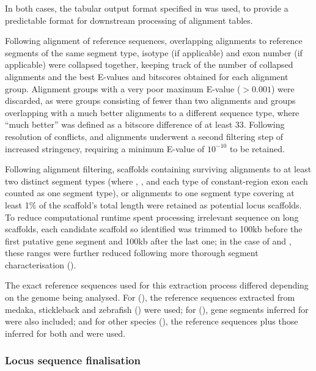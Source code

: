 \noindent In both cases, the tabular output format specified in  was used, to provide a predictable format for downstream processing of  alignment tables.

Following alignment of reference sequences, overlapping alignments to reference segments of the same segment type, isotype (if applicable) and exon number (if applicable) were collapsed together, keeping track of the number of collapsed alignments and the best E-values and bitscores obtained for each alignment group. Alignment groups with a very poor maximum E-value ($> 0.001$) were discarded, as were groups consisting of fewer than two alignments and groups overlapping with a much better alignments to a different sequence type, where ``much better'' was defined as a bitscore difference of at least 33. Following resolution of conflicts, \vh and \ch alignments underwent a second filtering step of increased stringency, requiring a minimum E-value of $10^{-10}$ to be retained. 

Following alignment filtering, scaffolds containing surviving alignments to at least two distinct segment types (where \vh, \jh, and each type of constant-region exon each counted as one segment type), or alignments to one segment type covering at least 1\% of the scaffold's total length were retained as potential locus scaffolds. To reduce computational runtime spent processing irrelevant sequence on long scaffolds, each candidate scaffold so identified was trimmed to 100kb before the first putative gene segment and 100kb after the last one; in the case of \nfu and \xma, these ranges were further reduced following more thorough segment characterisation ().

The exact reference sequences used for this extraction process differed depending on the genome being analysed. For \nfu (), the reference sequences extracted from medaka, stickleback and zebrafish () were used; for \xma (), gene segments inferred for \Nfu were also included; and for other species (), the reference sequences plus those inferred for both \Nfu and \Xma were used.

\subsubsection{Locus sequence finalisation}
\label{sec:methods_comp_locus_final}

